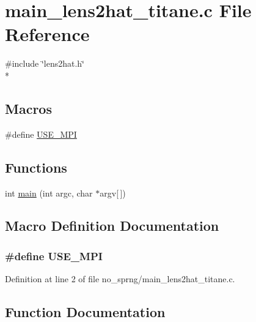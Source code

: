 \section{main\-\_\-lens2hat\-\_\-titane.\-c File Reference}
\label{no__sprng_2main__lens2hat__titane_8c}
{\ttfamily \#include \char`\"{}lens2hat.\-h\char`\"{}}\\*
\subsection*{Macros}
\begin{DoxyCompactItemize}
\item 
\#define \hyperlink{no__sprng_2main__lens2hat__titane_8c_a3869d282031f6ea6b50fdb980b758420}{U\-S\-E\-\_\-\-M\-P\-I}
\end{DoxyCompactItemize}
\subsection*{Functions}
\begin{DoxyCompactItemize}
\item 
int \hyperlink{no__sprng_2main__lens2hat__titane_8c_a0ddf1224851353fc92bfbff6f499fa97}{main} (int argc, char $\ast$argv\mbox{[}$\,$\mbox{]})
\end{DoxyCompactItemize}


\subsection{Macro Definition Documentation}
\subsubsection[{U\-S\-E\-\_\-\-M\-P\-I}]{\setlength{\rightskip}{0pt plus 5cm}\#define U\-S\-E\-\_\-\-M\-P\-I}\label{no__sprng_2main__lens2hat__titane_8c_a3869d282031f6ea6b50fdb980b758420}


Definition at line 2 of file no\-\_\-sprng/main\-\_\-lens2hat\-\_\-titane.\-c.



\subsection{Function Documentation}
